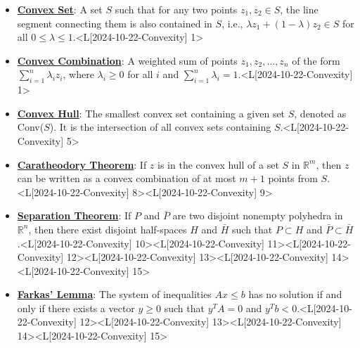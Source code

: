 \documentclass{article}%
\begin{document}
\begin{itemize}[[leftmargin=*]]%
\item \href{https://www.math.purdue.edu/~yipn/421/2024-10-22-Convexity.pdf#page=1}{\textbf{Convex Set}}: A set $S$ such that for any two points $z_1, z_2 \in S$, the line segment connecting them is also contained in $S$, i.e., $\lambda z_1 + (1-\lambda)z_2 \in S$ for all $0 \le \lambda \le 1$.<L[2024-10-22-Convexity] 1>%
\item \href{https://www.math.purdue.edu/~yipn/421/2024-10-22-Convexity.pdf#page=1}{\textbf{Convex Combination}}: A weighted sum of points $z_1, z_2, \dots, z_n$ of the form $\sum_{i=1}^n \lambda_i z_i$, where $\lambda_i \ge 0$ for all $i$ and $\sum_{i=1}^n \lambda_i = 1$.<L[2024-10-22-Convexity] 1>%
\item \href{https://www.math.purdue.edu/~yipn/421/2024-10-22-Convexity.pdf#page=5}{\textbf{Convex Hull}}: The smallest convex set containing a given set $S$, denoted as Conv($S$). It is the intersection of all convex sets containing $S$.<L[2024-10-22-Convexity] 5>%
\item \href{https://www.math.purdue.edu/~yipn/421/2024-10-22-Convexity.pdf#page=8}{\textbf{Caratheodory Theorem}}: If $z$ is in the convex hull of a set $S$ in $\mathbb{R}^m$, then $z$ can be written as a convex combination of at most $m+1$ points from $S$.<L[2024-10-22-Convexity] 8><L[2024-10-22-Convexity] 9>%
\item \href{https://www.math.purdue.edu/~yipn/421/2024-10-22-Convexity.pdf#page=10}{\textbf{Separation Theorem}}: If $P$ and $\bar{P}$ are two disjoint nonempty polyhedra in $\mathbb{R}^n$, then there exist disjoint half-spaces $H$ and $\bar{H}$ such that $P \subset H$ and $\bar{P} \subset \bar{H}$.<L[2024-10-22-Convexity] 10><L[2024-10-22-Convexity] 11><L[2024-10-22-Convexity] 12><L[2024-10-22-Convexity] 13><L[2024-10-22-Convexity] 14><L[2024-10-22-Convexity] 15>%
\item \href{https://www.math.purdue.edu/~yipn/421/2024-10-22-Convexity.pdf#page=12}{\textbf{Farkas' Lemma}}: The system of inequalities $Ax \le b$ has no solution if and only if there exists a vector $y \ge 0$ such that $y^T A = 0$ and $y^T b < 0$.<L[2024-10-22-Convexity] 12><L[2024-10-22-Convexity] 13><L[2024-10-22-Convexity] 14><L[2024-10-22-Convexity] 15>%
\end{itemize}%
\end{document}
